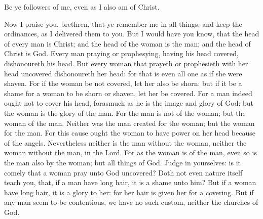  Be ye followers of me, even as I also am of Christ.

 Now I praise you, brethren, that ye remember me in all
things, and keep the ordinances, as I delivered them to you.
 But I would have you know, that the head of every man is
Christ; and the head of the woman is the man; and the head of Christ is
God.  Every man praying or prophesying, having his head
covered, dishonoureth his head.  But every woman that
prayeth or prophesieth with her head uncovered dishonoureth her head:
for that is even all one as if she were shaven.  For if the
woman be not covered, let her also be shorn: but if it be a shame for a
woman to be shorn or shaven, let her be covered.  For a man
indeed ought not to cover his head, forasmuch as he is the image and
glory of God: but the woman is the glory of the man.  For
the man is not of the woman; but the woman of the man. 
Neither was the man created for the woman; but the woman for the man.
 For this cause ought the woman to have power on her head
because of the angels.  Nevertheless neither is the man
without the woman, neither the woman without the man, in the Lord.
 For as the woman is of the man, even so is the man also by
the woman; but all things of God.  Judge in yourselves: is
it comely that a woman pray unto God uncovered?  Doth not
even nature itself teach you, that, if a man have long hair, it is a
shame unto him?  But if a woman have long hair, it is a
glory to her: for her hair is given her for a covering. 
But if any man seem to be contentious, we have no such custom, neither
the churches of God.


